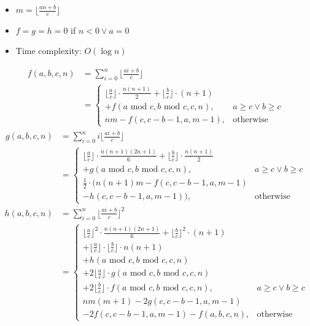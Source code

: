 \begin{itemize}
  \item $m = \lfloor\frac{an + b}{c}\rfloor$
  \item $f = g = h = 0$ if $n < 0 \lor a = 0$
  \item Time complexity: $O(\log{n})$
\end{itemize}

$$ \begin{aligned}
  f(a, b, c, n) &= \sum_{i = 0}^{n}\lfloor\frac{ai + b}{c}\rfloor \\
  &= \begin{cases} 
    \lfloor\frac{a}{c}\rfloor \cdot \frac{n(n + 1)}{2} + \lfloor\frac{b}{c}\rfloor \cdot (n + 1) \\ + f(a\text{ mod } c, b\text{ mod } c, c, n), & a \geq c \lor b \geq c \\ 
    nm - f(c, c - b - 1, a, m - 1), & \text{otherwise} 
  \end{cases} 
\end{aligned} $$
$$ \begin{aligned}
  g(a, b, c, n) &= \sum_{i = 0}^{n}i\lfloor\frac{ai + b}{c}\rfloor \\
  &= \begin{cases}
    \lfloor{\frac{a}{c}}\rfloor \cdot \frac{n(n + 1)(2n + 1)}{6} + \lfloor\frac{b}{c}\rfloor \cdot \frac{n(n + 1)}{2} \\ + g(a\text{ mod } c, b\text{ mod } c, c, n), & a \geq c \lor b \geq c \\
    \frac{1}{2} \cdot (n(n + 1)m - f(c, c - b - 1, a, m - 1) \\ - h(c, c - b - 1, a, m - 1)), & \text{otherwise}
  \end{cases}
\end{aligned} $$
$$ \begin{aligned}
  h(a, b, c, n) &= \sum_{i = 0}^{n}\lfloor\frac{ai + b}{c}\rfloor^2 \\
  &= \begin{cases}
    \lfloor\frac{a}{c}\rfloor^2 \cdot \frac{n(n + 1)(2n + 1)}{6} + \lfloor\frac{b}{c}\rfloor^2 \cdot (n + 1) \\ + \lfloor\frac{a}{c}\rfloor \cdot \lfloor\frac{b}{c}\rfloor \cdot n(n + 1) \\ + h(a\text{ mod } c, b\text{ mod } c, c, n) \\ + 2\lfloor\frac{a}{c}\rfloor \cdot g(a\text{ mod } c, b\text{ mod } c, c, n) \\ + 2\lfloor\frac{b}{c}\rfloor \cdot f(a\text{ mod } c, b\text{ mod } c, c, n), & a \geq c \lor b \geq c \\
    nm(m + 1) - 2g(c, c - b - 1, a, m - 1) \\ - 2f(c, c - b - 1, a, m - 1) - f(a, b, c, n), & \text{otherwise}
  \end{cases}
\end{aligned} $$

